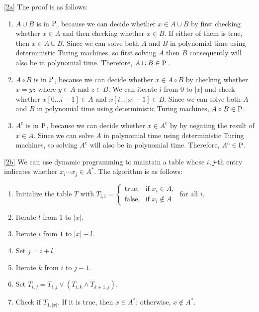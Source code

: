 \documentclass{homework}
\begin{document}
\begin{solution}

  \ref{2a} The proof is as follows:

  \begin{enumerate}
    \item $A \cup B$ is in $\P$, because we can decide whether $x \in A \cup B$
      by first checking whether $x \in A$ and then checking whether $x \in B$.
      If either of them is true, then $x \in A \cup B$.
      Since we can solve both $A$ and $B$ in polynomial time using deterministic
      Turing machines, so first solving $A$ then $B$ consequently will also be
      in polynomial time. Therefore, $A \cup B \in \P$.
    \item $A \circ B$ is in $\P$, because we can decide whether $x \in A \circ B$ by
      checking whether $x = yz$ where $y \in A$ and $z \in B$.
      We can iterate $i$ from $0$ to $|x|$ and check whether $x[0 \ldots i-1] \in A$
      and $x[i \ldots |x| - 1] \in B$.
      Since we can solve both $A$ and $B$ in polynomial time using deterministic Turing machines,
      $A \circ B \in \P$.
    \item $A^{\text{c}}$ is in $\P$, because we can decide whether $x \in A^{\text{c}}$ by
      by negating the result of $x \in A$. Since we can solve $A$ in polynomial time
      using deterministic Turing machines, so solving $A^{\text{c}}$ will also be in
      polynomial time. Therefore, $A^{\text{c}} \in \P$.
  \end{enumerate}

  \ref{2b} We can use dynamic programming to maintain a table whose $i,j$-th entry indicates
  whether $x_{i} \cdots x_{j} \in A^{*}$.
  The algorithm is as follows:
  \begin{enumerate}
    \item Initialize the table $T$ with $T_{i, i} = \begin{cases}
      \text{true}, &\text{if } x_i \in A, \\
      \text{false}, &\text{if } x_i \notin A \end{cases}$ for all $i$.
    \item Iterate $l$ from $1$ to $|x|$.
    \item Iterate $i$ from $1$ to $|x| - l$.
    \item Set $j = i + l$.
    \item Iterate $k$ from $i$ to $j - 1$.
    \item Set $T_{i, j} = T_{i, j} \vee (T_{i, k} \wedge T_{k+1, j})$.
    \item Check if $T_{1, |x|}$.
          If it is true, then $x \in A^{*}$;
          otherwise, $x \notin A^{*}$.
  \end{enumerate}


\end{solution}
\end{document}
